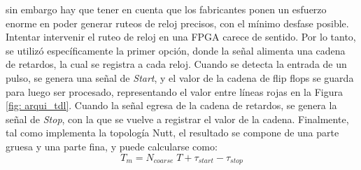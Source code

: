 sin embargo hay que tener en cuenta que los fabricantes ponen un esfuerzo enorme en poder generar ruteos
de reloj precisos, con el mínimo desfase posible. Intentar intervenir el ruteo de reloj en una FPGA
carece de sentido. Por lo tanto, se utilizó específicamente la primer opción, donde la señal alimenta una cadena de retardos, 
la cual se registra a cada reloj. Cuando se detecta la entrada de un pulso, se genera una señal de \textit{Start}, y
el valor de la cadena de flip flops se guarda para luego ser procesado, representando el valor entre líneas
rojas en la Figura \ref{fig: arqui_tdl}. Cuando la señal egresa de la cadena de retardos, se genera la señal
 de \textit{Stop}, con la que se vuelve a registrar el valor de la cadena. Finalmente, tal como implementa la
topología Nutt, el resultado se compone de una parte gruesa y una parte fina, y puede calcularse como:
\begin{equation*}
     T_{m} = N_{coarse} \; T + \tau_{start} - \tau_{stop}
\end{equation*}

